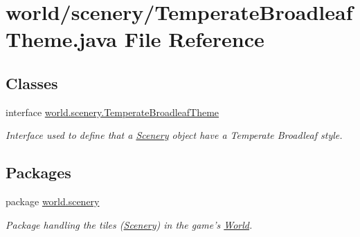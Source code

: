 \hypertarget{a00075}{\section{world/scenery/\-Temperate\-Broadleaf\-Theme.java File Reference}
\label{a00075}
}
\subsection*{Classes}
\begin{DoxyCompactItemize}
\item 
interface \hyperlink{a00030}{world.\-scenery.\-Temperate\-Broadleaf\-Theme}
\begin{DoxyCompactList}\small\item\em Interface used to define that a \hyperlink{a00024}{Scenery} object have a Temperate Broadleaf style. \end{DoxyCompactList}\end{DoxyCompactItemize}
\subsection*{Packages}
\begin{DoxyCompactItemize}
\item 
package \hyperlink{a00091}{world.\-scenery}
\begin{DoxyCompactList}\small\item\em Package handling the tiles (\hyperlink{a00024}{Scenery}) in the game's \hyperlink{a00039}{World}. \end{DoxyCompactList}\end{DoxyCompactItemize}
